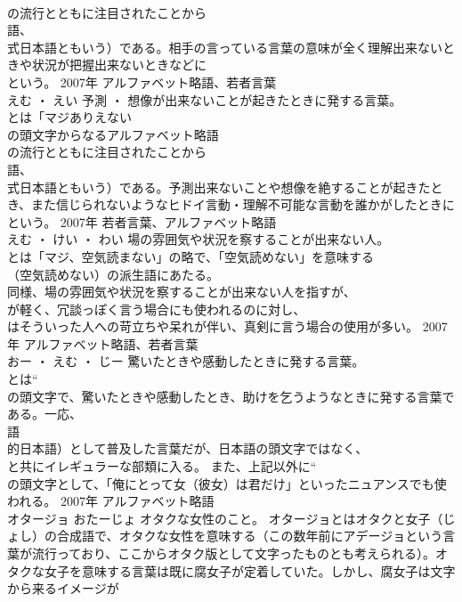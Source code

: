 \documentclass[8pt]{extreport}
\begin{document}
\begin{CJK}{UTF8}{min}
\\	の流行とともに注目されたことから
\\	語、
\\	式日本語ともいう）である。相手の言っている言葉の意味が全く理解出来ないときや状況が把握出来ないときなどに
\\	という。	2007年	アルファベット略語、若者言葉	
\\	えむ ・ えい	予測 ・ 想像が出来ないことが起きたときに発する言葉。	
\\	とは「マジありえない
\\	の頭文字からなるアルファベット略語
\\	の流行とともに注目されたことから
\\	語、
\\	式日本語ともいう）である。予測出来ないことや想像を絶することが起きたとき、また信じられないようなヒドイ言動・理解不可能な言動を誰かがしたときに
\\	という。	2007年	若者言葉、アルファベット略語	
\\	えむ ・ けい ・ わい	場の雰囲気や状況を察することが出来ない人。	
\\	とは「マジ、空気読まない」の略で、「空気読めない」を意味する
\\	（空気読めない）の派生語にあたる。
\\	同様、場の雰囲気や状況を察することが出来ない人を指すが、
\\	が軽く、冗談っぽく言う場合にも使われるのに対し、
\\	はそういった人への苛立ちや呆れが伴い、真剣に言う場合の使用が多い。	2007年	アルファベット略語、若者言葉	
\\	おー ・ えむ ・ じー	驚いたときや感動したときに発する言葉。	
\\	とは“
\\	の頭文字で、驚いたときや感動したとき、助けを乞うようなときに発する言葉である。一応、
\\	語
\\	的日本語）として普及した言葉だが、日本語の頭文字ではなく、
\\	と共にイレギュラーな部類に入る。 また、上記以外に“
\\	の頭文字として、「俺にとって女（彼女）は君だけ」といったニュアンスでも使われる。	2007年	アルファベット略語	
\\	オタージョ	おたーじょ	オタクな女性のこと。	オタージョとはオタクと女子（じょし）の合成語で、オタクな女性を意味する（この数年前にアデージョという言葉が流行っており、ここからオタク版として文字ったものとも考えられる）。オタクな女子を意味する言葉は既に腐女子が定着していた。しかし、腐女子は文字から来るイメージが

\end{CJK}
\end{document}
